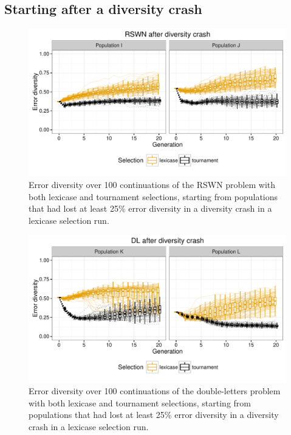 \documentclass{sig-alternate-05-2015}
\begin{document}
\subsection{Starting after a diversity crash}
\label{sec:crashDiversityResults}



\begin{figure}
	\includegraphics{../figures/RSWN_diversity_crash}
	\vspace{-1 cm}
	\caption{Error diversity over 100 continuations of the RSWN problem with both lexicase and tournament selections, starting from populations that had lost at least 25\% error diversity in a diversity crash in a lexicase selection run.}
	\label{fig:RSWNdiversityCrash}
\end{figure}

\begin{figure}
	\includegraphics{../figures/DL_diversity_crash}
	\vspace{-1 cm}
	\caption{Error diversity over 100 continuations of the double-letters problem with both lexicase and tournament selections, starting from populations that had lost at least 25\% error diversity in a diversity crash in a lexicase selection run.}
	\label{fig:DLdiversityCrash}
\end{figure}
\end{document}
